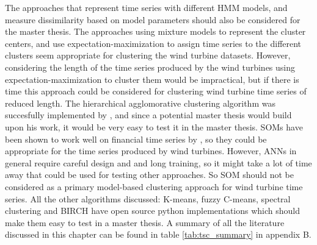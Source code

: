 The approaches that represent time series with different HMM models, and measure dissimilarity based on model parameters \cite{multivariate_tsc_hmm} should also be considered for the master thesis.
The approaches using mixture models to represent the cluster centers, and use expectation-maximization to assign time series to the different clusters seem appropriate for clustering the wind turbine datasets.
However, considering the length of the time series produced by the wind turbines using expectation-maximization to cluster them would be impractical, but if there is time this approach could be considered for clustering wind turbine time series of reduced length. 
The hierarchical agglomorative clustering algorithm was succesfully implemented by \textcite{espen}, and since a potential master thesis would build upon his work, it would be very easy to test it in the master thesis. 
SOMs have been shown to work well on financial time series by \cite{ghsom_optimal_hedge_ratio, stock_price_tsc_regr_trees_som}, 
so they could be appropriate for the time series produced by wind turbines. 
However, ANNs in general require careful design and and long training, so it might take a lot of time away that could be used for testing other approaches. 
So SOM should not be considered as a primary model-based clustering approach for wind turbine time series. 
All the other algorithms discussed: K-means, fuzzy C-means, spectral clustering and BIRCH have open source python implementations which should make them
easy to test in a master thesis. 
A summary of all the literature discussed in this chapter can be found in table \ref{tab:tsc_summary} in appendix B.